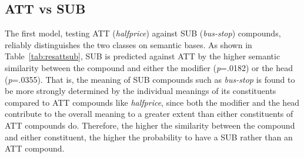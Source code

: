 \documentclass[output=paper]{langsci/langscibook}
\begin{document}
\begin{table}[t]
\caption{Results of the logit model opposing ATT (1) to SUB (0).\label{tab:resattsub}}
\end{table}

\subsection{ATT vs SUB}

The first model, testing ATT (\emph{halfprice}) against SUB (\emph{bus-stop}) compounds, reliably distinguishes the two classes on semantic bases. As shown in Table~\ref{tab:resattsub}, SUB is predicted against ATT by the higher semantic similarity between the compound and either the modifier (\emph{p}=.0182) or the head (\emph{p}=.0355). That is, the meaning of SUB compounds such as \emph{bus-stop} is found to be more strongly determined by the individual meanings of its constituents compared to ATT compounds like \emph{halfprice}, since both the modifier and the head contribute to the overall meaning to a greater extent than either constituents of ATT compounds do. Therefore, the higher the similarity between the compound and either constituent, the higher the probability to have a SUB rather than an ATT compound.
\end{document}

